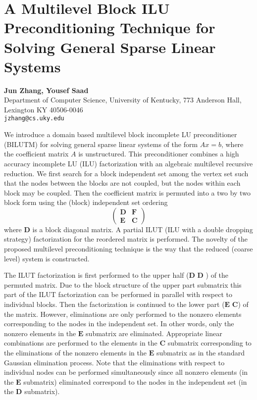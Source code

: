 \documentclass[11pt]{article}
\newcommand{\nextab}[4]{
	\section{#2}
	{\bf #1} \\ \nopagebreak
	{#3} \\ \nopagebreak
	{\tt #4} \nopagebreak
	}
\begin{document}

\nextab{Jun Zhang, Yousef Saad}
	{A Multilevel Block ILU Preconditioning Technique for
		Solving General Sparse Linear Systems}
	{Department of Computer Science, University of Kentucky,
		773 Anderson Hall, Lexington KY 40506-0046}
	{jzhang@cs.uky.edu}

We introduce a domain based multilevel block incomplete LU
preconditioner (BILUTM) for solving general sparse linear
systems of the form $Ax=b$, where the coefficient matrix $A$
is unstructured. This preconditioner combines a high accuracy
incomplete LU (ILU) factorization with an algebraic multilevel
recursive
reduction.  We first search for a block independent set among
the vertex set such that the nodes between the blocks are not
coupled, but the nodes within each block may be coupled. Then
the coefficient matrix  is permuted  into a
two by two block  form   using  the (block)  independent
set  ordering
$$
	\left( \begin{array}{cc}
	{\mathbf D} & {\mathbf F} \\
	{\mathbf E} & {\mathbf C}
	\end{array} \right)
$$
where ${\mathbf D}$ is a block diagonal matrix.
A partial ILUT (ILU with a double dropping strategy)
factorization for the   reordered  matrix is performed.
The novelty of the proposed multilevel
preconditioning technique is the
way that the reduced (coarse level) system is constructed.

The ILUT factorization is first performed to the upper half
(${\mathbf D}$  ${\mathbf D}$ ) of the permuted matrix.
Due to the block structure of the
upper part submatrix this part of the ILUT factorization
can be performed in parallel with respect to individual
blocks. Then the factorization is continued to the lower
part (${\mathbf E}$ ${\mathbf C}$) of the matrix.
However, eliminations are only performed
to the nonzero elements corresponding to the nodes in the
independent set. In other words, only the nonzero elements in
the ${\mathbf E}$ submatrix are eliminated. Appropriate linear combinations
are performed to the elements in the ${\mathbf C}$ submatrix corresponding
to the eliminations of the nonzero elements in the ${\mathbf E}$ submatrix as
in the standard Gaussian elimination process.
Note that the eliminations with respect to
individual nodes can be performed simultaneously since all
nonzero elements (in the ${\mathbf E}$ submatrix) eliminated correspond to
the nodes  in the independent set (in the ${\mathbf D}$ submatrix).
\end{document}
